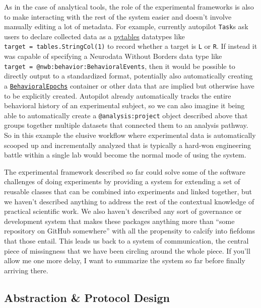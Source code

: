 \documentclass[10pt]{tufte-book}
\begin{document}
As in the case of analytical tools, the role of the experimental
frameworks is also to make interacting with the rest of the system
easier and doesn't involve manually editing a lot of metadata. For
example, currently autopilot \texttt{Task}s ask users to declare
collected data as a \href{https://www.pytables.org/}{pytables} \citep{altedPyTablesProcessingAnalyzing2003}  datatypes like
\texttt{target\ =\ tables.StringCol(1)} to record whether a target is
\texttt{\textquotesingle{}L\textquotesingle{}} or
\texttt{\textquotesingle{}R\textquotesingle{}}. If instead it was
capable of specifying a Neurodata Without Borders data type like
\texttt{target\ =\ \textquotesingle{}@nwb:behavior:BehavioralEvents\textquotesingle{}},
then it would be possible to directly output to a standardized format,
potentially also automatically creating a
\href{https://pynwb.readthedocs.io/en/stable/pynwb.behavior.html\#pynwb.behavior.BehavioralEpochs}{\texttt{BehavioralEpochs}}
container or other data that are implied but otherwise have to be
explicitly created. Autopilot already automatically tracks the entire
behavioral history of an experimental subject, so we can also imagine it
being able to automatically create a \texttt{@analysis:project} object
described above that groups together multiple datasets that connected
them to an analysis pathway. So in this example the elusive workflow
where experimental data is automatically scooped up and incrementally
analyzed that is typically a hard-won engineering battle within a single
lab would become the normal mode of using the system.

The experimental framework described so far could solve some of the
software challenges of doing experiments by providing a system for
extending a set of reusable classes that can be combined into
experiments and linked together, but we haven't described anything to
address the rest of the contextual knowledge of practical scientific
work. We also haven't described any sort of governance or development
system that makes these packages anything more than ``some repository on
GitHub somewhere'' with all the propensity to calcify into fiefdoms that
those entail. This leads us back to a system of communication, the
central piece of missingness that we have been circling around the whole
piece. If you'll allow me one more delay, I want to summarize the system
so far before finally arriving there.






\subsection{Abstraction \& Protocol
Design}
\end{document}
